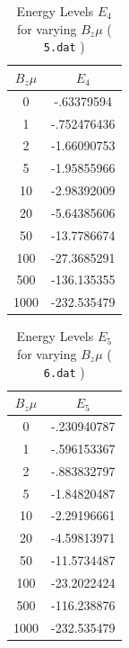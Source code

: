 \documentclass[a4paper]{IEEEtran}
\begin{document}
    \begin{table} 
        \caption{Energy Levels $E_4$ for varying $B_z\mu$ ( \texttt{5.dat} )}
        \label{tbl:energy-5} 
        \begin{center}
        \begin{tabular}{|c|c|} \hline
        $B_z\mu$ & $E_4$ \\ \hline \hline
        0    &  -.63379594 \\ \hline
        1    &  -.752476436 \\ \hline
        2    &  -1.66090753 \\ \hline
        5    &  -1.95855966 \\ \hline
        10   &  -2.98392009\\ \hline
        20   &  -5.64385606 \\ \hline
        50   &  -13.7786674 \\ \hline
        100  &  -27.3685291 \\ \hline
        500  &  -136.135355 \\ \hline
        1000 &  -232.535479 \\ \hline
        \end{tabular}
        \end{center} 
    \end{table} 

    \begin{table} 
        \caption{Energy Levels $E_5$ for varying $B_z\mu$ ( \texttt{6.dat} ) }
        \label{tbl:energy-6} 
         \begin{center}
        \begin{tabular}{|c|c|} \hline
        $B_z\mu$ & $E_5$ \\ \hline \hline
        0     & -.230940787 \\ \hline
        1     & -.596153367 \\ \hline
        2     & -.883832797 \\ \hline
        5     & -1.84820487 \\ \hline
        10    & -2.29196661 \\ \hline
        20    & -4.59813971 \\ \hline
        50    & -11.5734487\\ \hline
        100   & -23.2022424 \\ \hline
        500   & -116.238876 \\ \hline
        1000  & -232.535479 \\ \hline
        \end{tabular}
        \end{center} 
    \end{table} 
\end{document}
